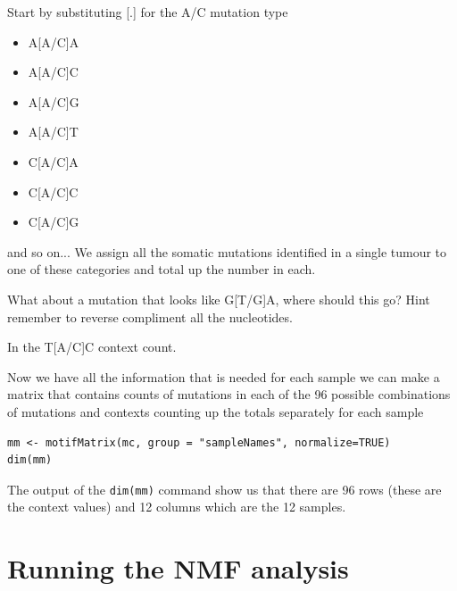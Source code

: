 \begin{information}
\vspace{4 mm}
Start by substituting [.] for the A/C mutation type
\begin{itemize}
\item A[A/C]A
\item A[A/C]C	    
\item A[A/C]G	    
\item A[A/C]T
\item C[A/C]A
\item C[A/C]C
\item C[A/C]G
\end{itemize}
and so on...
\vspace{4 mm}
We assign all the somatic mutations identified in a single tumour to one of these categories and total up the number in each.
\end{information}

\begin{questions}
What about a mutation that looks like G[T/G]A, where should this go?
Hint remember to reverse compliment all the nucleotides.
\end{questions}

\begin{answer}
    In the T[A/C]C context count.
\end{answer}

\begin{steps}
Now we have all the information that is needed for each sample we can make a matrix
that contains counts of mutations in each of the 96 possible combinations of
mutations and contexts counting up the totals separately for each sample

\begin{lstlisting}
mm <- motifMatrix(mc, group = "sampleNames", normalize=TRUE)
dim(mm)
\end{lstlisting}
\end{steps}

The output of the \texttt{dim(mm)} command show us that there are 96 rows (these are the context values)
and 12 columns which are the 12 samples.


\section{Running the NMF analysis}

